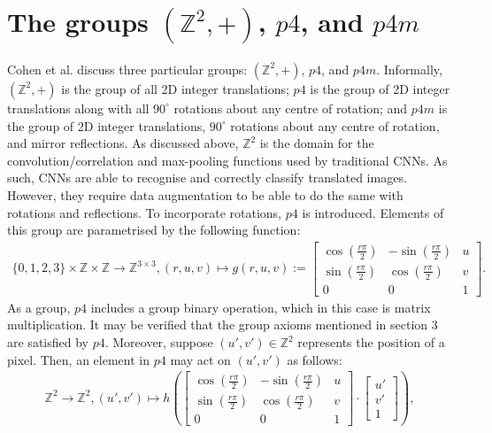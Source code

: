\documentclass{article}
\begin{document}
\section{The groups \((\mathbb{Z}^2, +)\), \(p4\), and \(p4m\)}
    Cohen et al. discuss three particular groups: \((\mathbb{Z}^2, +)\), \(p4\), and \(p4m\). Informally, \((\mathbb{Z}^2, +)\) is the group of all 2D integer translations; \(p4\) is the group of 2D integer translations along with all \(90^\circ\) rotations about any centre of rotation; and \(p4m\) is the group of 2D integer translations, \(90^\circ\) rotations about any centre of rotation, and mirror reflections. As discussed above, \(\mathbb{Z}^2\) is the domain for the convolution/correlation and max-pooling functions used by traditional CNNs. As such, CNNs are able to recognise and correctly classify translated images. However, they require data augmentation to be able to do the same with rotations and reflections. To incorporate rotations, \(p4\) is introduced. Elements of this group are parametrised by the following function:
    \begin{align*}
        \{0, 1, 2, 3\} \times \mathbb{Z} \times \mathbb{Z} \to \mathbb{Z}^{3 \times 3}, (r, u, v) \mapsto g(r, u, v) := \begin{bmatrix}
            \cos\left(\frac{r\pi}{2}\right) & -\sin\left(\frac{r\pi}{2}\right) & u \\
            \sin\left(\frac{r\pi}{2}\right) & \cos\left(\frac{r\pi}{2}\right) & v \\
            0 & 0 & 1
        \end{bmatrix}.
    \end{align*}
    As a group, \(p4\) includes a group binary operation, which in this case is matrix multiplication. It may be verified that the group axioms mentioned in section 3 are satisfied by \(p4\). Moreover, suppose \((u', v') \in \mathbb{Z}^2\) represents the position of a pixel. Then, an element in \(p4\) may act on \((u', v')\) as follows:
    \begin{align*}
        \mathbb{Z}^2 \to \mathbb{Z}^2, (u', v') \mapsto h\left(\begin{bmatrix}
            \cos\left(\frac{r\pi}{2}\right) & -\sin\left(\frac{r\pi}{2}\right) & u \\
            \sin\left(\frac{r\pi}{2}\right) & \cos\left(\frac{r\pi}{2}\right) & v \\
            0 & 0 & 1
        \end{bmatrix} \cdot \begin{bmatrix}
            u' \\
            v' \\
            1
        \end{bmatrix}\right),
    \end{align*}
\end{document}
